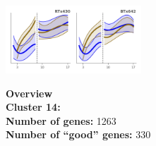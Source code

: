 \begin{multicols}{2}
\includegraphics[width=2in]{figures/clusters/leaf_Preflowering_13.png}
\columnbreak

\noindent \textbf{Overview}\\\textbf{Cluster 14:}  \\
\textbf{Number of genes:} 1263 \\
\textbf{Number of ``good'' genes:} 330 \\
\end{multicols}

